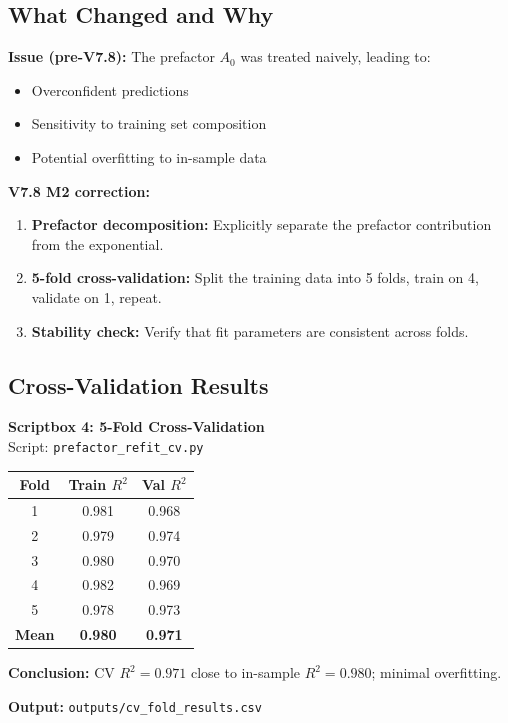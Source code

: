 \documentclass[11pt,a4paper]{article}
\begin{document}
\subsection{What Changed and Why}

\begin{warnbox}[title={\textbf{Previous Problem}}]
\textbf{Issue (pre-V7.8):} The prefactor $A_0$ was treated naively, leading to:
\begin{itemize}[nosep]
    \item Overconfident predictions
    \item Sensitivity to training set composition
    \item Potential overfitting to in-sample data
\end{itemize}
\end{warnbox}

\textbf{V7.8 M2 correction:}
\begin{enumerate}
    \item \textbf{Prefactor decomposition:} Explicitly separate the prefactor contribution from the exponential.

    \item \textbf{5-fold cross-validation:} Split the training data into 5 folds, train on 4, validate on 1, repeat.

    \item \textbf{Stability check:} Verify that fit parameters are consistent across folds.
\end{enumerate}

\subsection{Cross-Validation Results}

\begin{scriptbox}
\textbf{Scriptbox 4: 5-Fold Cross-Validation}\\
Script: \texttt{prefactor\_refit\_cv.py}

\begin{center}
\begin{tabular}{ccc}
\toprule
\textbf{Fold} & \textbf{Train $R^2$} & \textbf{Val $R^2$} \\
\midrule
1 & 0.981 & 0.968 \\
2 & 0.979 & 0.974 \\
3 & 0.980 & 0.970 \\
4 & 0.982 & 0.969 \\
5 & 0.978 & 0.973 \\
\midrule
\textbf{Mean} & \textbf{0.980} & \textbf{0.971} \\
\bottomrule
\end{tabular}
\label{tab:cv_results}
\end{center}

\textbf{Conclusion:} CV $R^2 = 0.971$ close to in-sample $R^2 = 0.980$; minimal overfitting.

\textbf{Output:} \texttt{outputs/cv\_fold\_results.csv}
\end{scriptbox}
\label{sb:cv}
\end{document}
